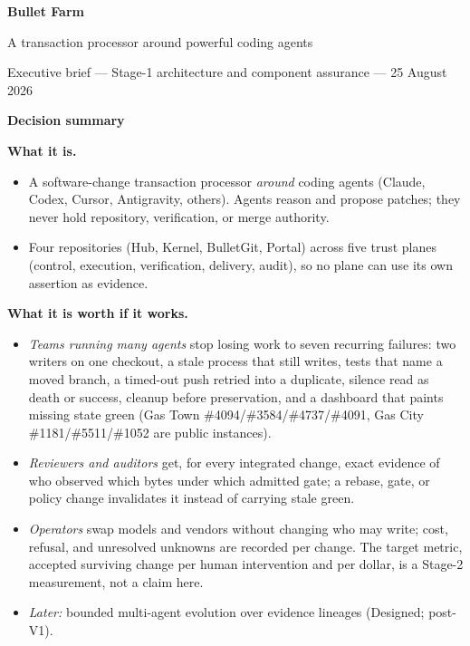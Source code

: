 \documentclass[11pt,letterpaper]{article}
\newenvironment{tight}{\setlength{\topsep}{1pt}\setlength{\partopsep}{0pt}\begin{itemize}\setlength{\itemsep}{1pt}\setlength{\parskip}{0pt}\setlength{\parsep}{0pt}}{\end{itemize}}
\newcommand{\block}[2]{\vspace{1pt}\textbf{#1}{\footnotesize\ #2}\par\vspace{-2pt}}
\begin{document}
\begin{center}
{\LARGE\bfseries Bullet Farm}\par
\vspace{1pt}
{\Large A transaction processor around powerful coding agents}\par
\vspace{2pt}
{\small Executive brief --- Stage-1 architecture and component assurance --- 25 August 2026}
\end{center}

{\large\bfseries Decision summary}\par
\small\setlength{\parskip}{3pt}
\block{What it is.}{}
\begin{tight}
\item A software-change transaction processor \emph{around} coding agents
(Claude, Codex, Cursor, Antigravity, others). Agents reason and propose
patches; they never hold repository, verification, or merge authority.
\item Four repositories (Hub, Kernel, BulletGit, Portal) across five trust
planes (control, execution, verification, delivery, audit), so no plane can
use its own assertion as evidence.
\end{tight}

\block{What it is worth if it works.}{}
\begin{tight}
\item \emph{Teams running many agents} stop losing work to seven recurring
failures: two writers on one checkout, a stale process that still writes,
tests that name a moved branch, a timed-out push retried into a duplicate,
silence read as death or success, cleanup before preservation, and a dashboard
that paints missing state green (Gas Town \#4094/\#3584/\#4737/\#4091, Gas
City \#1181/\#5511/\#1052 are public instances).
\item \emph{Reviewers and auditors} get, for every integrated change, exact
evidence of who observed which bytes under which admitted gate; a rebase,
gate, or policy change invalidates it instead of carrying stale green.
\item \emph{Operators} swap models and vendors without changing who may write;
cost, refusal, and unresolved unknowns are recorded per change. The target
metric, accepted surviving change per human intervention and per dollar, is a
Stage-2 measurement, not a claim here.
\item \emph{Later:} bounded multi-agent evolution over evidence lineages (Designed; post-V1).
\end{tight}
\end{document}

